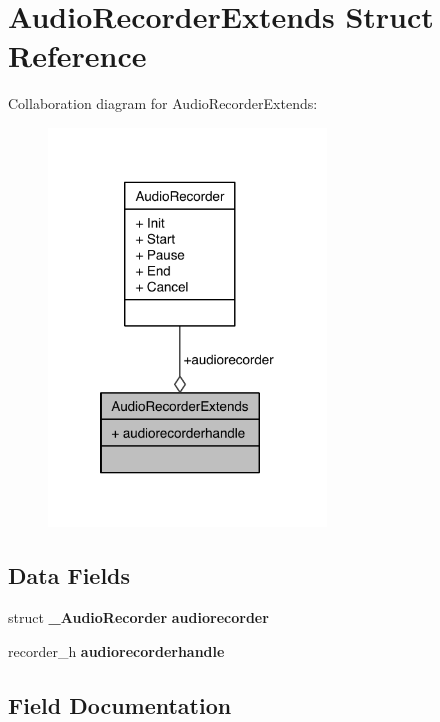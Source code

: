 \section{Audio\-Recorder\-Extends Struct Reference}
\label{structAudioRecorderExtends}


Collaboration diagram for Audio\-Recorder\-Extends\-:\nopagebreak
\begin{figure}[H]
\begin{center}
\leavevmode
\includegraphics[width=209pt]{structAudioRecorderExtends__coll__graph}
\end{center}
\end{figure}
\subsection*{Data Fields}
\begin{DoxyCompactItemize}
\item 
struct {\bf \-\_\-\-Audio\-Recorder} {\bfseries audiorecorder}\label{structAudioRecorderExtends_a6db621dfa99af22b9a1f3a649d1e13c4}

\item 
recorder\-\_\-h {\bfseries audiorecorderhandle}\label{structAudioRecorderExtends_aa26ae04fd12ea75dbfbe51164087aa7a}

\end{DoxyCompactItemize}


\subsection{Field Documentation}
